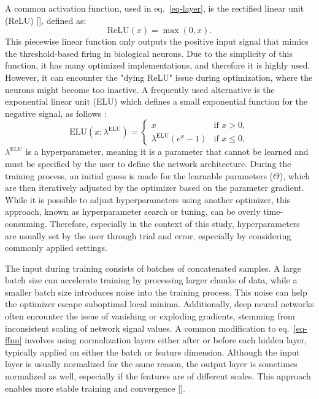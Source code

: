 \documentclass[12pt,a4paper]{report}
\begin{document}
A common activation function, used in eq.~\ref{eq-layer}, is the rectified linear unit (ReLU) [\cite{fukushima1980,nair2010}], defined as:
%
\begin{equation}
\text{ReLU}(x) = \max(0, x).
\end{equation}
%
This piecewise linear function only outputs the positive input signal that mimics the threshold-based firing in biological neurons. Due to the simplicity of this function, it has many optimized implementations, and therefore it is highly used.  However, it can encounter the "dying ReLU" issue during optimization, where the neurons might become too inactive. A frequently used alternative is the exponential linear unit (ELU) which defines a small exponential function for the negative signal, as follows :
%
\begin{equation}
 \text{ELU}(x;\lambda^{\text{ELU}}) = 
\begin{cases} 
x & \text{if } x > 0, \\
\lambda^{\text{ELU}} (e^x - 1) & \text{if } x \leq 0,
\end{cases}
\end{equation}
%
$\lambda^{\text{ELU}}$ is a hyperparameter, meaning it is a parameter that cannot be learned and must be specified by the user to define the network architecture. During the training process, an initial guess is made for the learnable parameters ($\Theta$), which are then iteratively adjusted by the optimizer based on the parameter gradient. While it is possible to adjust hyperparameters using another optimizer, this approach, known as hyperparameter search or tuning, can be overly time-consuming. Therefore, especially in the context of this study, hyperparameters are usually set by the user through trial and error, especially by considering commonly applied settings.

The input during training consists of batches of concatenated samples. A large batch size can accelerate training by processing larger chunks of data, while a smaller batch size introduces noise into the training process. This noise can help the optimizer escape suboptimal local minima. Additionally, deep neural networks often encounter the issue of vanishing or exploding gradients, stemming from inconsistent scaling of network signal values. A common modification to eq.~\ref{eq-ffnn} involves using normalization layers either after or before each hidden layer, typically applied on either the batch or feature dimension. Although the input layer is usually normalized for the same reason, the output layer is sometimes normalized as well, especially if the features are of different scales. This approach enables more stable training and convergence [\cite{ioffe2015, bjorck2018, jingjing2019, gao2020, singh2022}].
\end{document}
